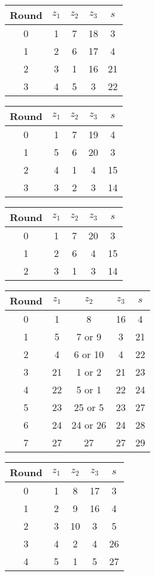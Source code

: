 \begin{tabular}{c | c | c | c | c }
Round & $z_1$ & $z_2$ & $z_3$ & $s$ \\
\hline
0 & 1 & 7 & 18 & 3 \\
1 & 2 & 6 & 17 & 4 \\
2 & 3 & 1 & 16 & 21 \\
3 & 4 & 5 & 3 & 22
\end{tabular}

\begin{tabular}{c | c | c | c | c }
Round & $z_1$ & $z_2$ & $z_3$ & $s$ \\
\hline
0 & 1 & 7 & 19 & 4 \\
1 & 5 & 6 & 20 & 3 \\
2 & 4 & 1 & 4 & 15 \\
3 & 3 & 2 & 3 & 14
\end{tabular}

\begin{tabular}{c | c | c | c | c }
Round & $z_1$ & $z_2$ & $z_3$ & $s$ \\
\hline
0 & 1 & 7 & 20 & 3 \\
1 & 2 & 6 & 4 & 15 \\
2 & 3 & 1 & 3 & 14
\end{tabular}

\begin{tabular}{c | c | c | c | c }
Round & $z_1$ & $z_2$ & $z_3$ & $s$ \\
\hline
0 & 1 & 8 & 16 & 4 \\
1 & 5 & 7 or 9 & 3 & 21 \\
2 & 4 & 6 or 10 & 4 &  22 \\
3 & 21 & 1 or 2 & 21 & 23 \\
4 & 22 & 5 or 1 & 22 & 24 \\
5 & 23 & 25 or 5 & 23 & 27 \\
6 & 24 & 24 or 26 & 24 & 28 \\
7 & 27 & 27 & 27 & 29
\end{tabular}

\begin{tabular}{c | c | c | c | c }
Round & $z_1$ & $z_2$ & $z_3$ & $s$ \\
\hline
0 & 1 & 8 & 17 & 3 \\
1 & 2 & 9 & 16 & 4 \\
2 & 3 & 10 & 3 & 5 \\
3 & 4 & 2 & 4 & 26 \\
4 & 5 & 1 & 5 & 27
\end{tabular}

